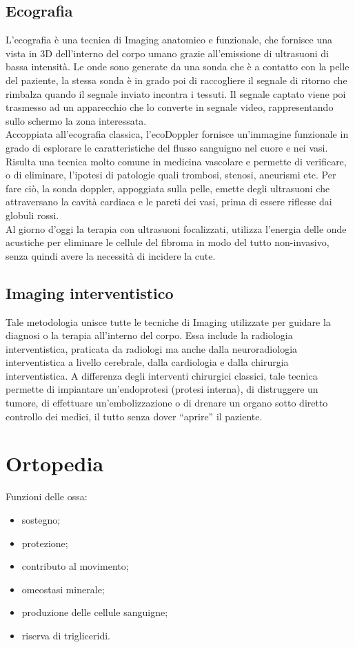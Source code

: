 \documentclass[a4paper]{article}
\begin{document}
\subsection{Ecografia}
L’ecografia è una tecnica di Imaging anatomico e funzionale, che fornisce 
una vista in 3D dell’interno del corpo umano grazie all’emissione di 
ultrasuoni di bassa intensità. Le onde sono generate da una sonda che è a 
contatto con la pelle del paziente, la stessa sonda è in grado poi
di raccogliere il segnale di ritorno che rimbalza quando il segnale inviato 
incontra i tessuti. Il segnale captato viene poi trasmesso ad un apparecchio 
che lo converte in segnale video, rappresentando sullo schermo la zona 
interessata. \\
Accoppiata all’ecografia classica, l’ecoDoppler fornisce un’immagine 
funzionale in grado di esplorare le caratteristiche del flusso sanguigno 
nel cuore e nei vasi. Risulta una tecnica molto comune in medicina vascolare 
e permette di verificare, o di eliminare, l’ipotesi di patologie quali 
trombosi, stenosi, aneurismi etc. Per fare ciò, la sonda doppler, 
appoggiata sulla pelle, emette degli ultrasuoni che attraversano la cavità 
cardiaca e le pareti dei vasi, prima di essere riflesse dai globuli rossi.
\\
Al giorno d'oggi la terapia con ultrasuoni focalizzati, utilizza l’energia 
delle onde acustiche per eliminare le cellule del fibroma in modo del tutto 
non-invasivo, senza quindi avere la necessità di incidere la cute.

\subsection{Imaging interventistico}
Tale metodologia unisce tutte le tecniche di Imaging utilizzate per guidare 
la diagnosi o la terapia all’interno del corpo. Essa include la radiologia 
interventistica, praticata da radiologi ma anche dalla neuroradiologia
interventistica a livello cerebrale, dalla cardiologia e dalla chirurgia 
interventistica. A differenza degli interventi chirurgici classici, tale 
tecnica permette di impiantare un’endoprotesi (protesi interna), di
distruggere un tumore, di effettuare un’embolizzazione o di drenare un 
organo sotto diretto controllo dei medici, il tutto senza dover “aprire” il 
paziente.

\section{Ortopedia}
Funzioni delle ossa:
\begin{itemize}
\item sostegno;
\item protezione;
\item contributo al movimento;
\item omeostasi minerale;
\item produzione delle cellule sanguigne;
\item riserva di trigliceridi.
\end{itemize}
\end{document}
